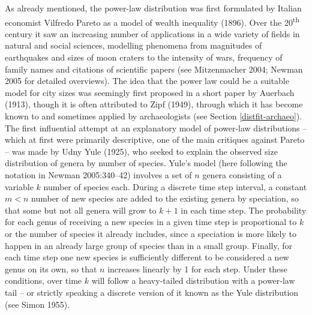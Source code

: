 \documentclass[
  12pt,
]{book}
\begin{document}
As already mentioned, the power-law distribution was first formulated by Italian economist Vilfredo Pareto as a model of wealth inequality (1896). Over the 20\textsuperscript{th} century it saw an increasing number of applications in a wide variety of fields in natural and social sciences, modelling phenomena from magnitudes of earthquakes and sizes of moon craters to the intensity of wars, frequency of family names and citations of scientific papers (see Mitzenmacher 2004; Newman 2005 for detailed overviews). The idea that the power law could be a suitable model for city sizes was seemingly first proposed in a short paper by Auerbach (1913), though it is often attributed to Zipf (1949), through which it has become known to and sometimes applied by archaeologists (see Section \ref{distfit-archaeo}). The first influential attempt at an explanatory model of power-law distributions -- which at first were primarily descriptive, one of the main critiques against Pareto -- was made by Udny Yule (1925), who seeked to explain the observed size distribution of genera by number of species. Yule's model (here following the notation in Newman 2005:340--42) involves a set of \(n\) genera consisting of a variable \(k\) number of species each. During a discrete time step interval, a constant \(m < n\) number of new species are added to the existing genera by speciation, so that some but not all genera will grow to \(k+1\) in each time step. The probability for each genus of receiving a new species in a given time step is proportional to \(k\) or the number of species it already includes, since a speciation is more likely to happen in an already large group of species than in a small group. Finally, for each time step one new species is sufficiently different to be considered a new genus on its own, so that \(n\) increases linearly by 1 for each step. Under these conditions, over time \(k\) will follow a heavy-tailed distribution with a power-law tail -- or strictly speaking a discrete version of it known as the Yule distribution (see Simon 1955).
\end{document}
